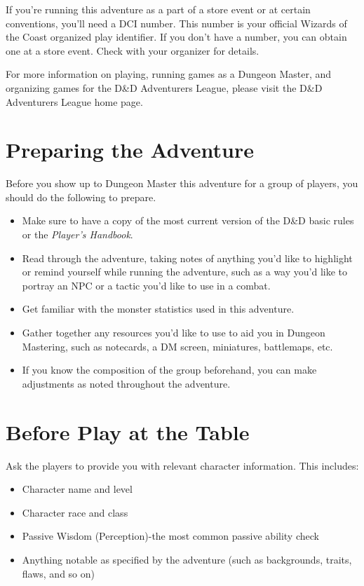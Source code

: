 \documentclass[10pt,a4paper,twoside,bg=print,twocolumn,openany,nodeprecatedcode]{dndbook}
\begin{document}
If you're running this adventure as a part of a store event or at certain conventions, you'll need a DCI number. This number is your official Wizards of the Coast organized play identifier. If you don't have a number, you can obtain one at a store event. Check with your organizer for details.

For more information on playing, running games as a Dungeon Master, and organizing games for the D\&D Adventurers League, please visit the D\&D Adventurers League home page.

\section{Preparing the Adventure}
Before you show up to Dungeon Master this adventure for a group of players, you should do the following to prepare.


\begin{itemize}
\item Make sure to have a copy of the most current version of the D\&D basic rules or the \textit{Player's Handbook}.
\item Read through the adventure, taking notes of anything you'd like to highlight or remind yourself while running the adventure, such as a way you'd like to portray an NPC or a tactic you'd like to use in a combat.
\item Get familiar with the monster statistics used in this adventure.
\item Gather together any resources you'd like to use to aid you in Dungeon Mastering, such as notecards, a DM screen, miniatures, battlemaps, etc.
\item If you know the composition of the group beforehand, you can make adjustments as noted throughout the adventure.
\end{itemize}

\section{Before Play at the Table}
Ask the players to provide you with relevant character information. This includes:


\begin{itemize}
\item Character name and level
\item Character race and class
\item Passive Wisdom (Perception)-the most common passive ability check
\item Anything notable as specified by the adventure (such as backgrounds, traits, flaws, and so on)
\end{itemize}
\end{document}
